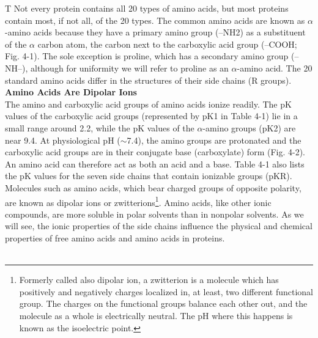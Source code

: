 T Not every protein contains all 20 types of amino acids, but most proteins contain most, if not all, of the 20 types. The common amino acids are known as $\alpha$-amino acids because they have a primary amino group (--NH2) as a substituent of the $\alpha$ carbon atom, the carbon next to the carboxylic acid group (--COOH; Fig. 4-1). The sole exception is proline, which has a secondary amino group (--NH--), although for uniformity we will refer to proline as an $\alpha$-amino acid. The 20 standard amino acids differ in the structures of their side chains (R groups). 
\\
\textbf{Amino Acids Are Dipolar Ions}\\
The amino and carboxylic acid groups of amino acids ionize readily. The pK values of the carboxylic acid groups (represented by pK1 in Table 4-1) lie in a small range around 2.2, while the pK values of the $\alpha$-amino groups (pK2) are near 9.4. At physiological pH ($\sim$7.4), the amino groups are protonated and the carboxylic acid groups are in their conjugate base (carboxylate) form (Fig. 4-2). An amino acid can therefore act as both an acid and a base. Table 4-1 also lists the pK values for the seven side chains that contain ionizable groups (pKR). Molecules such as amino acids, which bear charged groups of opposite polarity, are known as dipolar ions or zwitterions\footnote{Formerly called also dipolar ion, a zwitterion is a molecule which has positively and negatively charges localized in, at least, two different functional group. The charges on the functional groups balance each other out, and the molecule as a whole is electrically neutral. The pH where this happens is known as the isoelectric point.}. Amino acids, like other ionic compounds, are more soluble in polar solvents than in nonpolar solvents. As we will see, the ionic properties of the side chains influence the physical and chemical properties of free amino acids and amino acids in proteins.
\cite{voet2016fundamentals}\\
\\
